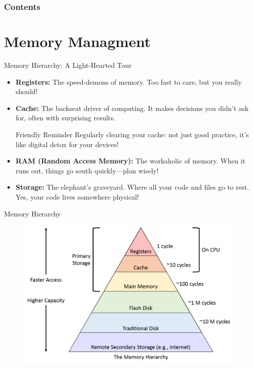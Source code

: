 \documentclass[10pt]{beamer}
\title[Universidad Panamericana]{}
\subtitle{FreeRTOS Architecture Part 1}
\author[]{Name}
\institute[ltonix@up.edu.mx]{Universidad Panamericana}
\date[Presentation \today]{Presentation \today}
\begin{document}
\frame{\titlepage}
\begin{frame}
\frametitle{Contents}
\tableofcontents
\end{frame}

\section{Memory Managment}

\begin{frame}{Memory Hierarchy: A Light-Hearted Tour}
  \begin{itemize}
    \item \textbf{Registers:} The speed-demons of memory. Too fast to care, but you really should!
    \item \textbf{Cache:} The backseat driver of computing. It makes decisions you didn't ask for, often with surprising results.
    \begin{alertblock}{Friendly Reminder}
      Regularly clearing your cache: not just good practice, it's like digital detox for your devices!
    \end{alertblock}
    \item \textbf{RAM (Random Access Memory):} The workaholic of memory. When it runs out, things go south quickly—plan wisely!
    \item \textbf{Storage:} The elephant's graveyard. Where all your code and files go to rest. Yes, your code lives somewhere physical!
  \end{itemize}
\end{frame}

\begin{frame}{Memory Hierarchy}
  \begin{figure}[h]
    \centering
    \includegraphics[width=1.0\textwidth]{figures/MemoryHerarchy.png}
    \label{fig:MemoryHerarchy}
  \end{figure}
\end{frame}
\end{document}
